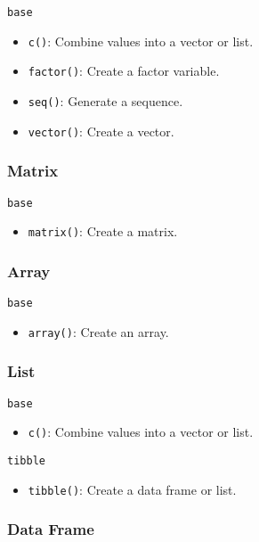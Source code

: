 \documentclass[]{book}
\providecommand{\tightlist}{%
  \setlength{\itemsep}{0pt}\setlength{\parskip}{0pt}}
\theoremstyle{definition}
\theoremstyle{definition}
\theoremstyle{definition}
\theoremstyle{remark}
\begin{document}
\texttt{base}

\begin{itemize}
\tightlist
\item
  \texttt{c()}: Combine values into a vector or list.
\item
  \texttt{factor()}: Create a factor variable.
\item
  \texttt{seq()}: Generate a sequence.
\item
  \texttt{vector()}: Create a vector.
\end{itemize}

\subsubsection{Matrix}\label{matrix}

\texttt{base}

\begin{itemize}
\tightlist
\item
  \texttt{matrix()}: Create a matrix.
\end{itemize}

\subsubsection{Array}\label{array}

\texttt{base}

\begin{itemize}
\tightlist
\item
  \texttt{array()}: Create an array.
\end{itemize}

\subsubsection{List}\label{list}

\texttt{base}

\begin{itemize}
\tightlist
\item
  \texttt{c()}: Combine values into a vector or list.
\end{itemize}

\texttt{tibble}

\begin{itemize}
\tightlist
\item
  \texttt{tibble()}: Create a data frame or list.
\end{itemize}

\subsubsection{Data Frame}\label{data-frame}
\end{document}
